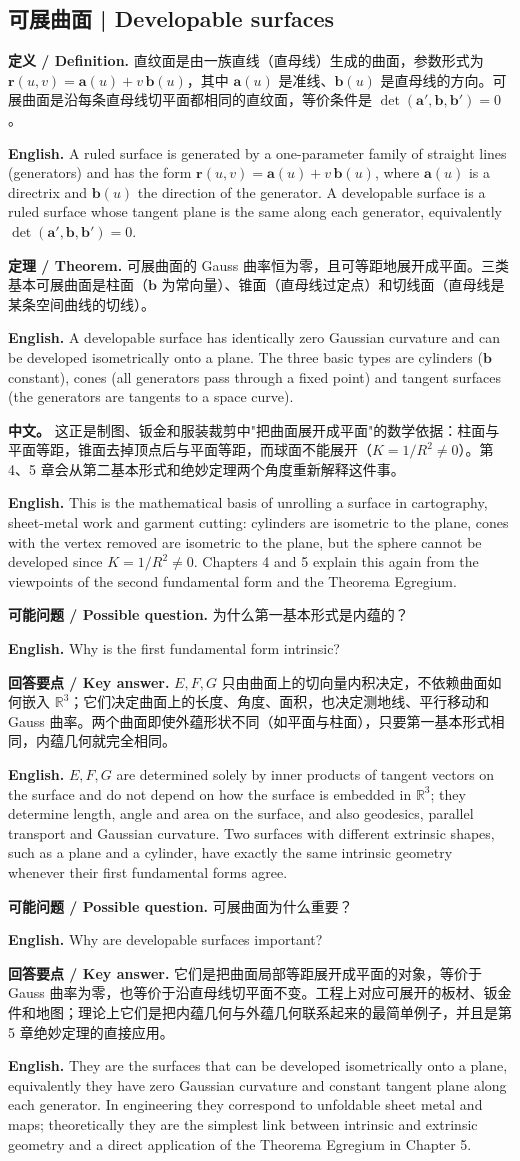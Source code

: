 \documentclass[UTF8,11pt,a4paper]{ctexart}
\newcommand{\APS}[2]{\par\noindent\textbf{中文。} #1\par\noindent\textbf{English.} #2\par\smallskip}
\newcommand{\EN}[1]{\par\noindent \textbf{English.} #1\par}
\newcommand{\ASK}[4]{\par\noindent \textbf{可能问题 / Possible question.} #1\par\EN{#2}\noindent \textbf{回答要点 / Key answer.} #3\par\EN{#4}\medskip}
\newcommand{\DEF}[2]{\par\noindent\textbf{定义 / Definition.} #1\par\EN{#2}\par\smallskip}
\newcommand{\THM}[2]{\par\noindent\textbf{定理 / Theorem.} #1\par\EN{#2}\par\smallskip}
\newcommand{\RR}{\mathbb{R}}
\newcommand{\br}{\mathbf{r}}
\newcommand{\ba}{\mathbf{a}}
\newcommand{\bb}{\mathbf{b}}
\begin{document}
\subsection{可展曲面 | Developable surfaces}
\DEF{直纹面是由一族直线（直母线）生成的曲面，参数形式为 $\br(u,v)=\ba(u)+v\,\bb(u)$，其中 $\ba(u)$ 是准线、$\bb(u)$ 是直母线的方向。可展曲面是沿每条直母线切平面都相同的直纹面，等价条件是 $\det(\ba',\bb,\bb')=0$。}{A ruled surface is generated by a one-parameter family of straight lines (generators) and has the form $\br(u,v)=\ba(u)+v\,\bb(u)$, where $\ba(u)$ is a directrix and $\bb(u)$ the direction of the generator. A developable surface is a ruled surface whose tangent plane is the same along each generator, equivalently $\det(\ba',\bb,\bb')=0$.}
\THM{可展曲面的 Gauss 曲率恒为零，且可等距地展开成平面。三类基本可展曲面是柱面（$\bb$ 为常向量）、锥面（直母线过定点）和切线面（直母线是某条空间曲线的切线）。}{A developable surface has identically zero Gaussian curvature and can be developed isometrically onto a plane. The three basic types are cylinders ($\bb$ constant), cones (all generators pass through a fixed point) and tangent surfaces (the generators are tangents to a space curve).}
\APS{这正是制图、钣金和服装裁剪中"把曲面展开成平面"的数学依据：柱面与平面等距，锥面去掉顶点后与平面等距，而球面不能展开（$K=1/R^2\ne0$）。第 4、5 章会从第二基本形式和绝妙定理两个角度重新解释这件事。}{This is the mathematical basis of unrolling a surface in cartography, sheet-metal work and garment cutting: cylinders are isometric to the plane, cones with the vertex removed are isometric to the plane, but the sphere cannot be developed since $K=1/R^2\ne0$. Chapters 4 and 5 explain this again from the viewpoints of the second fundamental form and the Theorema Egregium.}
\ASK{为什么第一基本形式是内蕴的？}{Why is the first fundamental form intrinsic?}{$E,F,G$ 只由曲面上的切向量内积决定，不依赖曲面如何嵌入 $\RR^3$；它们决定曲面上的长度、角度、面积，也决定测地线、平行移动和 Gauss 曲率。两个曲面即使外蕴形状不同（如平面与柱面），只要第一基本形式相同，内蕴几何就完全相同。}{$E,F,G$ are determined solely by inner products of tangent vectors on the surface and do not depend on how the surface is embedded in $\RR^3$; they determine length, angle and area on the surface, and also geodesics, parallel transport and Gaussian curvature. Two surfaces with different extrinsic shapes, such as a plane and a cylinder, have exactly the same intrinsic geometry whenever their first fundamental forms agree.}
\ASK{可展曲面为什么重要？}{Why are developable surfaces important?}{它们是把曲面局部等距展开成平面的对象，等价于 Gauss 曲率为零，也等价于沿直母线切平面不变。工程上对应可展开的板材、钣金件和地图；理论上它们是把内蕴几何与外蕴几何联系起来的最简单例子，并且是第 5 章绝妙定理的直接应用。}{They are the surfaces that can be developed isometrically onto a plane, equivalently they have zero Gaussian curvature and constant tangent plane along each generator. In engineering they correspond to unfoldable sheet metal and maps; theoretically they are the simplest link between intrinsic and extrinsic geometry and a direct application of the Theorema Egregium in Chapter 5.}
\end{document}
